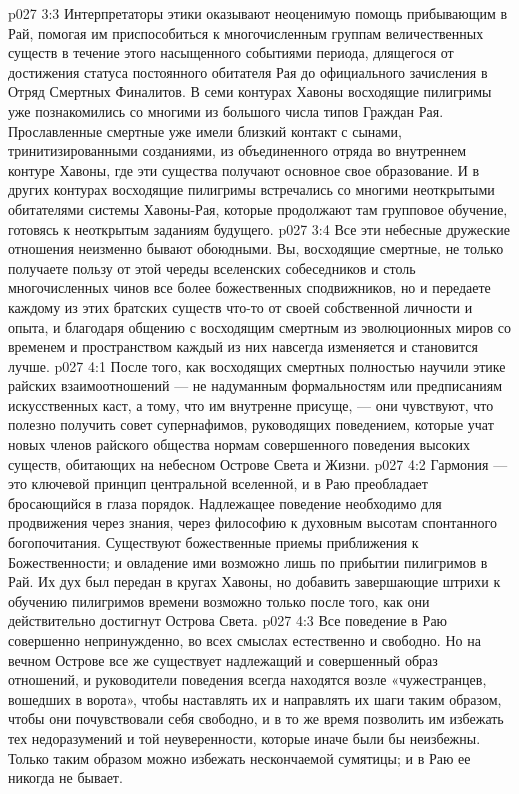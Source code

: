 \vs p027 3:3 Интерпретаторы этики оказывают неоценимую помощь прибывающим в Рай, помогая им приспособиться к многочисленным группам величественных существ в течение этого насыщенного событиями периода, длящегося от достижения статуса постоянного обитателя Рая до официального зачисления в Отряд Смертных Финалитов. В семи контурах Хавоны восходящие пилигримы уже познакомились со многими из большого числа типов Граждан Рая. Прославленные смертные уже имели близкий контакт с сынами, тринитизированными созданиями, из объединенного отряда во внутреннем контуре Хавоны, где эти существа получают основное свое образование. И в других контурах восходящие пилигримы встречались со многими неоткрытыми обитателями системы Хавоны\hyp{}Рая, которые продолжают там групповое обучение, готовясь к неоткрытым заданиям будущего.
\vs p027 3:4 Все эти небесные дружеские отношения неизменно бывают обоюдными. Вы, восходящие смертные, не только получаете пользу от этой череды вселенских собеседников и столь многочисленных чинов все более божественных сподвижников, но и передаете каждому из этих братских существ что\hyp{}то от своей собственной личности и опыта, и благодаря общению с восходящим смертным из эволюционных миров со временем и пространством каждый из них навсегда изменяется и становится лучше.
\vs p027 4:1 После того, как восходящих смертных полностью научили этике райских взаимоотношений --- не надуманным формальностям или предписаниям искусственных каст, а тому, что им внутренне присуще, --- они чувствуют, что полезно получить совет супернафимов, руководящих поведением, которые учат новых членов райского общества нормам совершенного поведения высоких существ, обитающих на небесном Острове Света и Жизни.
\vs p027 4:2 Гармония --- это ключевой принцип центральной вселенной, и в Раю преобладает бросающийся в глаза порядок. Надлежащее поведение необходимо для продвижения через знания, через философию к духовным высотам спонтанного богопочитания. Существуют божественные приемы приближения к Божественности; и овладение ими возможно лишь по прибытии пилигримов в Рай. Их дух был передан в кругах Хавоны, но добавить завершающие штрихи к обучению пилигримов времени возможно только после того, как они действительно достигнут Острова Света.
\vs p027 4:3 Все поведение в Раю совершенно непринужденно, во всех смыслах естественно и свободно. Но на вечном Острове все же существует надлежащий и совершенный образ отношений, и руководители поведения всегда находятся возле «чужестранцев, вошедших в ворота», чтобы наставлять их и направлять их шаги таким образом, чтобы они почувствовали себя свободно, и в то же время позволить им избежать тех недоразумений и той неуверенности, которые иначе были бы неизбежны. Только таким образом можно избежать нескончаемой сумятицы; и в Раю ее никогда не бывает.
